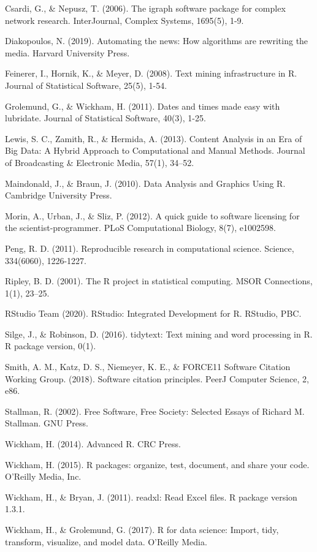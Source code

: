 \documentclass[
  b5paper]{book}
\begin{document}
Csardi, G., \& Nepusz, T. (2006). The igraph software package for complex network research. InterJournal, Complex Systems, 1695(5), 1-9.

Diakopoulos, N. (2019). Automating the news: How algorithms are rewriting the media. Harvard University Press.

Feinerer, I., Hornik, K., \& Meyer, D. (2008). Text mining infrastructure in R. Journal of Statistical Software, 25(5), 1-54.

Grolemund, G., \& Wickham, H. (2011). Dates and times made easy with lubridate. Journal of Statistical Software, 40(3), 1-25.

Lewis, S. C., Zamith, R., \& Hermida, A. (2013). Content Analysis in an Era of Big Data: A Hybrid Approach to Computational and Manual Methods. Journal of Broadcasting \& Electronic Media, 57(1), 34--52.

Maindonald, J., \& Braun, J. (2010). Data Analysis and Graphics Using R. Cambridge University Press.

Morin, A., Urban, J., \& Sliz, P. (2012). A quick guide to software licensing for the scientist-programmer. PLoS Computational Biology, 8(7), e1002598.

Peng, R. D. (2011). Reproducible research in computational science. Science, 334(6060), 1226-1227.

Ripley, B. D. (2001). The R project in statistical computing. MSOR Connections, 1(1), 23--25.

RStudio Team (2020). RStudio: Integrated Development for R. RStudio, PBC.

Silge, J., \& Robinson, D. (2016). tidytext: Text mining and word processing in R. R package version, 0(1).

Smith, A. M., Katz, D. S., Niemeyer, K. E., \& FORCE11 Software Citation Working Group. (2018). Software citation principles. PeerJ Computer Science, 2, e86.

Stallman, R. (2002). Free Software, Free Society: Selected Essays of Richard M. Stallman. GNU Press.

Wickham, H. (2014). Advanced R. CRC Press.

Wickham, H. (2015). R packages: organize, test, document, and share your code. O'Reilly Media, Inc.

Wickham, H., \& Bryan, J. (2011). readxl: Read Excel files. R package version 1.3.1.

Wickham, H., \& Grolemund, G. (2017). R for data science: Import, tidy, transform, visualize, and model data. O'Reilly Media.
\end{document}
